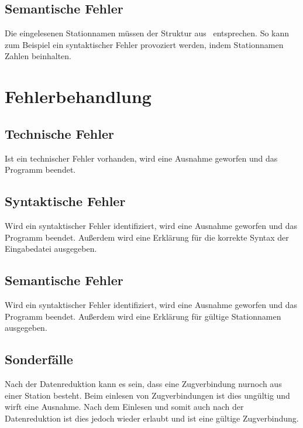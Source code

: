\subsection{Semantische Fehler}\label{subsec:semantische-fehler}
Die eingelesenen Stationnamen müssen der Struktur aus~ entsprechen.
So kann zum Beispiel ein syntaktischer Fehler provoziert werden, indem Stationnamen Zahlen beinhalten.

\section{Fehlerbehandlung}\label{sec:fehlerbehandlung}

\subsection{Technische Fehler}\label{subsec:technische-fehler-behandlung}
Ist ein technischer Fehler vorhanden, wird eine Ausnahme geworfen und das Programm beendet.


\subsection{Syntaktische Fehler}\label{subsec:syntaktische-fehler-behandlung}
Wird ein syntaktischer Fehler identifiziert, wird eine Ausnahme geworfen und das Programm beendet. Außerdem wird eine Erklärung für die korrekte Syntax der Eingabedatei ausgegeben.

\subsection{Semantische Fehler}\label{subsec:semantische-fehler-behandlung}
Wird ein syntaktischer Fehler identifiziert, wird eine Ausnahme geworfen und das Programm beendet. Außerdem wird eine Erklärung für gültige Stationnamen ausgegeben.


\subsection{Sonderfälle}\label{subsec:sonderfaelle}
Nach der Datenreduktion kann es sein, dass eine Zugverbindung nurnoch aus einer Station besteht. Beim einlesen von Zugverbindungen ist dies ungültig und wirft eine Ausnahme. Nach dem Einlesen und somit auch nach der Datenreduktion ist dies jedoch wieder erlaubt und ist eine gültige Zugverbindung.\\
